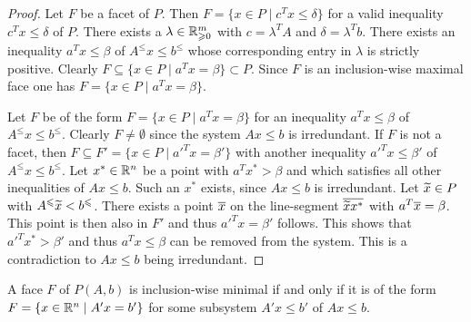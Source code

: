 \begin{proof}
  Let $F$ be a facet of $P$. Then $F = \{x \in P \mid c^Tx\leq\delta\}$ for a valid
  inequality $c^Tx\leq\delta$ of $P$. There exists a $\lambda \in \mathbb{R}_{\geqslant0}^m$ with
  $c=\lambda^TA$ and $\delta=\lambda^Tb$.  There exists an inequality  $a^Tx\leq\beta$ of
  $A^\leq x\leq b^\leq$ whose corresponding entry in $\lambda$ is strictly
  positive. Clearly $F\subseteq\{x \in P \mid a^Tx=\beta\}\subset P$. Since $F$ is an
  inclusion-wise maximal face one has $F = \{x \in P \mid a^Tx=\beta\}$. 
  
  Let $F$ be of the form $F = \{ x \in P \mid a^Tx = \beta\}$ for an inequality
  $a^Tx\leq\beta$ of $A^\leq x\leq b^\leq$.  Clearly $F \neq \emptyset$ since the system $Ax\leq b$ is
  irredundant. If $F$ is not a facet, then $F\subseteq F'=\{ x \in P \mid a'^Tx = \beta'\}$
  with another inequality $a'^Tx\leq\beta'$ of $A^\leq x\leq b^\leq$. Let $x^*\in \mathbb{R}^n$ be a point with
  $a^Tx^*>\beta$ and which satisfies all other inequalities of $Ax\leq b$. Such an $x^*$
  exists, since $Ax\leq b$ is irredundant.  Let $\widetilde{x}\in P$ with
  $A^\leqslant\widetilde{x}<b^\leqslant$.  There exists   a point $\overline{x}$ on the
  line-segment $\overline{\widetilde{x}x^*}$ with   $a^T\overline{x}=\beta$.  This point is then
  also in $F'$ and thus $a'^Tx = \beta'$ follows. This shows that
  $a'^Tx^*>\beta'$
  and thus $a^Tx\leq\beta$ can be
  removed from the system.  This is a contradiction to 
   $Ax\leq b$ being irredundant.  
\end{proof}



\begin{lemma}
  \label{po:lem:5}
  A face $F$ of $P(A,b)$ is inclusion-wise minimal if and only if it
  is of the form $F = \{ x \in \mathbb{R}^n \mid A'x=b'\}$ for some subsystem
    $A'x\leq b'$ of $Ax\leq b$. 
\end{lemma}


